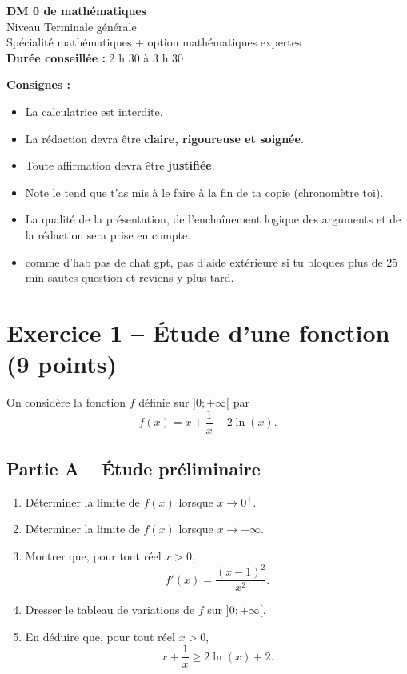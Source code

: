 \documentclass[11pt,a4paper]{article}
\begin{document}
\begin{center}
\begin{enteteDM}
{\LARGE \textbf{DM 0 de mathématiques}}\\[0.3em]
{\large Niveau Terminale générale}\\
{\normalsize Spécialité mathématiques + option mathématiques expertes}\\[0.4em]
\textbf{Durée conseillée :} 2 h 30 à 3 h 30
\end{enteteDM}
\end{center}

\vspace{0.4em}

\begin{consignesbox}
\textbf{Consignes :}
\begin{itemize}[leftmargin=1.2cm]
    \item La calculatrice est interdite.
    \item La rédaction devra être \textbf{claire, rigoureuse et soignée}.
    \item Toute affirmation devra être \textbf{justifiée}.
    \item Note le tend que t'as mis à le faire à la fin de ta copie (chronomètre toi).
    \item La qualité de la présentation, de l'enchaînement logique des arguments et de la rédaction sera prise en compte.
    \item comme d'hab pas de chat gpt, pas d'aide extérieure si tu bloques plus de 25 min sautes question et reviens-y plus tard.
\end{itemize}
\end{consignesbox}

\vspace{0.6em}

\section*{Exercice 1 -- Étude d'une fonction \hfill \textnormal{(9 points)}}

On considère la fonction \( f \) définie sur \( ]0;+\infty[ \) par
\[
f(x)=x+\frac{1}{x}-2\ln(x).
\]

\subsection*{Partie A -- Étude préliminaire}
\begin{enumerate}[label=\textbf{\arabic*.}, leftmargin=1.1cm]
    \item Déterminer la limite de \( f(x) \) lorsque \( x\to 0^+ \).
    \item Déterminer la limite de \( f(x) \) lorsque \( x\to +\infty \).
    \item Montrer que, pour tout réel \( x>0 \),
    \[
    f'(x)=\frac{(x-1)^2}{x^2}.
    \]
    \item Dresser le tableau de variations de \( f \) sur \( ]0;+\infty[ \).
    \item En déduire que, pour tout réel \( x>0 \),
    \[
    x+\frac{1}{x}\ge 2\ln(x)+2.
    \]
\end{enumerate}
\end{document}
